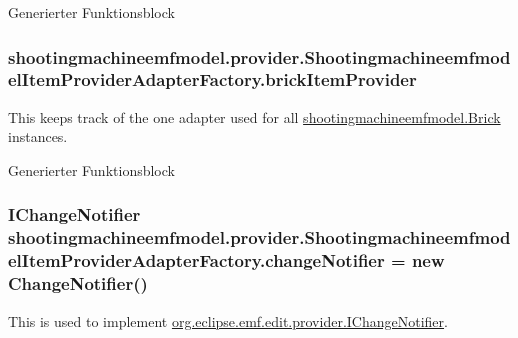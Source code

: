 Generierter Funktionsblock \hypertarget{classshootingmachineemfmodel_1_1provider_1_1_shootingmachineemfmodel_item_provider_adapter_factory_a106658c0a166931fc362f0d208dc170e}{
\subsubsection[{brick\-Item\-Provider}]{ shootingmachineemfmodel.\-provider.\-Shootingmachineemfmodel\-Item\-Provider\-Adapter\-Factory.\-brick\-Item\-Provider\hspace{0.3cm}{\ttfamily [protected]}}}\label{classshootingmachineemfmodel_1_1provider_1_1_shootingmachineemfmodel_item_provider_adapter_factory_a106658c0a166931fc362f0d208dc170e}
This keeps track of the one adapter used for all \hyperlink{interfaceshootingmachineemfmodel_1_1_brick}{shootingmachineemfmodel.\-Brick} instances.

Generierter Funktionsblock \hypertarget{classshootingmachineemfmodel_1_1provider_1_1_shootingmachineemfmodel_item_provider_adapter_factory_acc6bc88e6f012b19c0bb03bc1d36f806}{
\subsubsection[{change\-Notifier}]{\setlength{\rightskip}{0pt plus 5cm}I\-Change\-Notifier shootingmachineemfmodel.\-provider.\-Shootingmachineemfmodel\-Item\-Provider\-Adapter\-Factory.\-change\-Notifier = new Change\-Notifier()\hspace{0.3cm}{\ttfamily [protected]}}}\label{classshootingmachineemfmodel_1_1provider_1_1_shootingmachineemfmodel_item_provider_adapter_factory_acc6bc88e6f012b19c0bb03bc1d36f806}
This is used to implement \hyperlink{}{org.\-eclipse.\-emf.\-edit.\-provider.\-I\-Change\-Notifier}.

